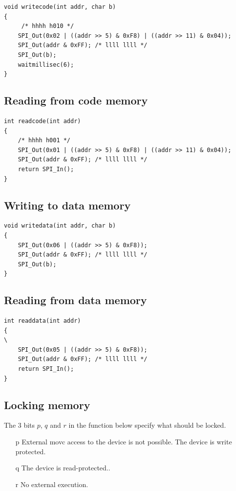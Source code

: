 \documentclass[a4paper]{article}
\begin{document}
\begin{lstlisting}
void writecode(int addr, char b)
{
     /* hhhh h010 */
	SPI_Out(0x02 | ((addr >> 5) & 0xF8) | ((addr >> 11) & 0x04));
	SPI_Out(addr & 0xFF); /* llll llll */
	SPI_Out(b);
	waitmillisec(6);
}
\end{lstlisting}

\subsection{Reading from code memory}

\begin{lstlisting}
int readcode(int addr)
{
    /* hhhh h001 */
	SPI_Out(0x01 | ((addr >> 5) & 0xF8) | ((addr >> 11) & 0x04));
	SPI_Out(addr & 0xFF); /* llll llll */
	return SPI_In();
}
\end{lstlisting}

\subsection{Writing to data memory}

\begin{lstlisting}
void writedata(int addr, char b)
{
	SPI_Out(0x06 | ((addr >> 5) & 0xF8));
	SPI_Out(addr & 0xFF); /* llll llll */
	SPI_Out(b);
}
\end{lstlisting}

\subsection{Reading from data memory}
\begin{lstlisting}
int readdata(int addr)
{
\
	SPI_Out(0x05 | ((addr >> 5) & 0xF8));
	SPI_Out(addr & 0xFF); /* llll llll */
	return SPI_In();
}
\end{lstlisting}

\subsection{Locking memory}

The 3 bits $p$, $q$ and $r$ in the function below specify what should be locked.

\begin{itemize}
\item[p] External movc access to the device is not possible. The device is 
write protected.
\item[q] The device is read-protected..
\item[r] No external execution.
\end{itemize}
\end{document}
